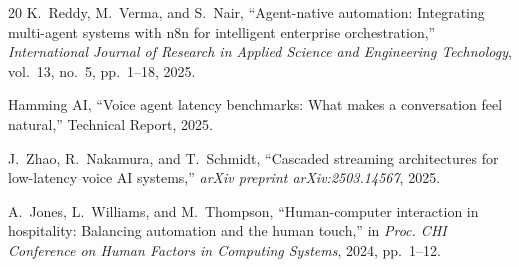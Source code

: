 \documentclass[conference]{IEEEtran}
\begin{document}
\begin{thebibliography}{20}
K.~Reddy, M.~Verma, and S.~Nair, ``Agent-native automation: Integrating multi-agent systems with n8n for intelligent enterprise orchestration,'' \textit{International Journal of Research in Applied Science and Engineering Technology}, vol.~13, no.~5, pp.~1--18, 2025.

Hamming AI, ``Voice agent latency benchmarks: What makes a conversation feel natural,'' Technical Report, 2025.

J.~Zhao, R.~Nakamura, and T.~Schmidt, ``Cascaded streaming architectures for low-latency voice AI systems,'' \textit{arXiv preprint arXiv:2503.14567}, 2025.

A.~Jones, L.~Williams, and M.~Thompson, ``Human-computer interaction in hospitality: Balancing automation and the human touch,'' in \textit{Proc. CHI Conference on Human Factors in Computing Systems}, 2024, pp.~1--12.

\end{thebibliography}
\end{document}
